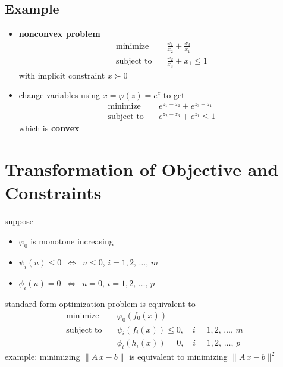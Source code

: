 \documentclass[11pt]{extarticle}
\newcommand{\ds}{\displaystyle}
\newcommand{\ifff}{\,\Longleftrightarrow\,}
\theoremstyle{definition}
\begin{document}
\subsection*{Example}
\begin{itemize}
  \item {\bf nonconvex problem}
    \begin{align*}
      \text{minimize}\quad & \frac{x_1}{x_2} + \frac{x_3}{x_1} \\
      \text{subject to}\quad & \frac{x_2}{x_3} + x_1\leqslant 1
    \end{align*}
    with implicit constraint $x\succ 0$
  \item change variables using $\ds x = \varphi(z) = e^z$ to get
    \begin{align*}
      \text{minimize}\quad & e^{z_1 - z_2} + e^{z_3 - z_1} \\
      \text{subject to}\quad & e^{z_2 - z_3} + e^{z_1}\leqslant 1
    \end{align*}
    which is {\bf convex}
\end{itemize}

\newpage

\section*{Transformation of Objective and Constraints}

suppose
\begin{itemize}
  \item $\varphi_0$ is monotone increasing
  \item $\psi_i(u)\leqslant 0$ $\ifff$ $u\leqslant 0$, $i = 1, 2,\,\ldots,\,m$
  \item $\phi_i(u) = 0$ $\ifff$ $u = 0$, $i = 1, 2,\,\ldots,\,p$
\end{itemize}
standard form optimization problem is equivalent to 
\begin{align*}
  \text{minimize}\quad &\varphi_0(f_0(x)) \\
  \text{subject to}\quad &\psi_i(f_i(x))\leqslant 0, \quad i = 1, 2,\,\ldots,\,m \\
  \qquad\qquad &\phi_i(h_i(x)) = 0, \quad i = 1, 2,\,\ldots,\,p
\end{align*}
example: minimizing $\|A\,x - b\|$ is equivalent to minimizing $\|A\,x - b\|^2$

\newpage
\end{document}

